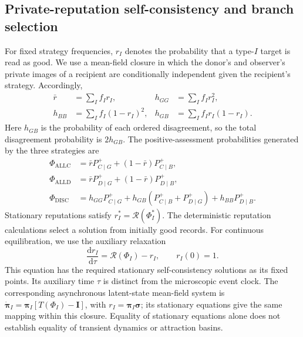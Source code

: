 \documentclass[fleqn,10pt]{article}
\begin{document}
\subsection*{Private-reputation self-consistency and branch selection}

For fixed strategy frequencies, $r_I$ denotes the probability that a type-$I$ target is read as good. We use a mean-field closure in which the donor's and observer's private images of a recipient are conditionally independent given the recipient's strategy. Accordingly,
\begin{equation}
\begin{aligned}
\bar r&=\sum_I f_Ir_I,&
h_{GG}&=\sum_I f_Ir_I^2,\\
h_{BB}&=\sum_I f_I(1-r_I)^2,&
h_{GB}&=\sum_I f_Ir_I(1-r_I).
\end{aligned}
\label{eq:methods-private-moments}
\end{equation}
Here $h_{GB}$ is the probability of each ordered disagreement, so the total disagreement probability is $2h_{GB}$. The positive-assessment probabilities generated by the three strategies are
\begin{equation}
\begin{aligned}
\Phi_{\mathrm{ALLC}}&=\bar rP^+_{C\mid G}+(1-\bar r)P^+_{C\mid B},\\
\Phi_{\mathrm{ALLD}}&=\bar rP^+_{D\mid G}+(1-\bar r)P^+_{D\mid B},\\
\Phi_{\mathrm{DISC}}&=h_{GG}P^+_{C\mid G}
+h_{GB}(P^+_{C\mid B}+P^+_{D\mid G})
+h_{BB}P^+_{D\mid B}.
\end{aligned}
\label{eq:methods-positive-assessment}
\end{equation}
Stationary reputations satisfy $r_I^*=\mathcal R(\Phi_I^*)$. The deterministic reputation calculations select a solution from initially good records. For continuous equilibration, we use the auxiliary relaxation
\begin{equation}
\frac{\mathrm dr_I}{\mathrm d\tau}=\mathcal R(\Phi_I)-r_I,
\qquad r_I(0)=1.
\label{eq:methods-reputation-dynamics}
\end{equation}
This equation has the required stationary self-consistency solutions as its fixed points. Its auxiliary time $\tau$ is distinct from the microscopic event clock. The corresponding asynchronous latent-state mean-field system is $\dot{\boldsymbol\pi}_I=\boldsymbol\pi_I[T(\Phi_I)-\mathbf I]$, with $r_I=\boldsymbol\pi_I\boldsymbol\sigma$; its stationary equations give the same mapping within this closure. Equality of stationary equations alone does not establish equality of transient dynamics or attraction basins.
\end{document}
